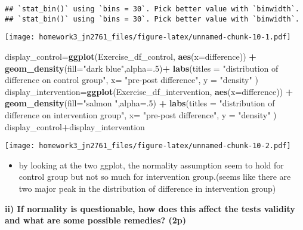 \documentclass[]{article}
\newenvironment{Shaded}{\begin{snugshade}}{\end{snugshade}}
\newcommand{\DataTypeTok}[1]{\textcolor[rgb]{0.13,0.29,0.53}{#1}}
\newcommand{\DecValTok}[1]{\textcolor[rgb]{0.00,0.00,0.81}{#1}}
\newcommand{\KeywordTok}[1]{\textcolor[rgb]{0.13,0.29,0.53}{\textbf{#1}}}
\newcommand{\NormalTok}[1]{#1}
\newcommand{\OperatorTok}[1]{\textcolor[rgb]{0.81,0.36,0.00}{\textbf{#1}}}
\newcommand{\StringTok}[1]{\textcolor[rgb]{0.31,0.60,0.02}{#1}}
\providecommand{\tightlist}{%
  \setlength{\itemsep}{0pt}\setlength{\parskip}{0pt}}
\begin{document}
\begin{verbatim}
## `stat_bin()` using `bins = 30`. Pick better value with `binwidth`.
## `stat_bin()` using `bins = 30`. Pick better value with `binwidth`.
\end{verbatim}

\texttt{[image: homework3\_jn2761\_files/figure-latex/unnamed-chunk-10-1.pdf]}

\begin{Shaded}
\begin{Highlighting}[]
\NormalTok{display_control=}\KeywordTok{ggplot}\NormalTok{(Exercise_df_control, }\KeywordTok{aes}\NormalTok{(}\DataTypeTok{x=}\NormalTok{difference)) }\OperatorTok{+}
\StringTok{  }\KeywordTok{geom_density}\NormalTok{(}\DataTypeTok{fill=}\StringTok{"dark blue"}\NormalTok{,}\DataTypeTok{alpha=}\NormalTok{.}\DecValTok{5}\NormalTok{)}\OperatorTok{+}
\StringTok{  }\KeywordTok{labs}\NormalTok{(}\DataTypeTok{titles =} \StringTok{"distribution of difference on control group"}\NormalTok{,}
       \DataTypeTok{x=} \StringTok{"pre-post difference"}\NormalTok{,}
       \DataTypeTok{y =} \StringTok{"density"}\NormalTok{  )}
\NormalTok{display_intervention=}\KeywordTok{ggplot}\NormalTok{(Exercise_df_intervention, }\KeywordTok{aes}\NormalTok{(}\DataTypeTok{x=}\NormalTok{difference)) }\OperatorTok{+}
\StringTok{   }\KeywordTok{geom_density}\NormalTok{(}\DataTypeTok{fill=}\StringTok{"salmon "}\NormalTok{,}\DataTypeTok{alpha=}\NormalTok{.}\DecValTok{5}\NormalTok{) }\OperatorTok{+}\StringTok{ }
\KeywordTok{labs}\NormalTok{(}\DataTypeTok{titles =} \StringTok{"distribution of difference on intervention group"}\NormalTok{,}
       \DataTypeTok{x=} \StringTok{"pre-post difference"}\NormalTok{,}
       \DataTypeTok{y =} \StringTok{"density"}\NormalTok{  )}
\NormalTok{display_control}\OperatorTok{+}\NormalTok{display_intervention}
\end{Highlighting}
\end{Shaded}

\texttt{[image: homework3\_jn2761\_files/figure-latex/unnamed-chunk-10-2.pdf]}

\begin{itemize}
\tightlist
\item
  by looking at the two ggplot, the normality assumption seem to hold
  for control group but not so much for intervention group.(seems like
  there are two major peak in the distribution of difference in
  intervention group)
\end{itemize}

\textbf{ii) If normality is questionable, how does this affect the tests
validity and what are some possible remedies? (2p)}
\end{document}
